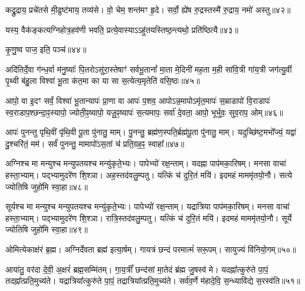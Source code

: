 कद्रु॒द्राय॒ प्रचे॑तसे मी॒ढुष्ट॑माय॒ तव्य॑से। 
वो॒ चेम॒ शन्त॑मꣳ हृ॒दे। 
सर्वो॒ ह्ये॑ष रु॒द्रस्तस्मै॑ रु॒द्राय॒ नमो॑ अस्तु॥४२॥
\anuvakamend

यस्य॒ वैक॑ङ्कत्यग्निहोत्र॒हव॑णी भवति॒ प्रत्ये॒वास्याऽऽहु॑तय\-स्तिष्ठ॒न्त्यथो॒ प्रति॑ष्ठित्यै॥४३॥
\anuvakamend


कृ॒णु॒ष्व पाज॒ इति॒ पञ्च॑॥४४॥
\anuvakamend

अदि॑तिर्दे॒वा ग॑न्ध॒र्वा म॑नु॒ष्याः᳚ पि॒तरोऽसु॑रा॒स्तेषाꣳ॑ सर्वभू॒तानां᳚ मा॒ता मे॒दिनी॑ मह॒ता म॒ही सा॑वि॒त्री गा॑य॒त्री जग॑त्यु॒र्वी पृ॒थ्वी ब॑हु॒ला विश्वा॑ भू॒ता क॑त॒मा का या सा स॒त्येत्य॒मृतेति॑ वसि॒ष्ठः॥४५॥
\anuvakamend

आपो॒ वा इ॒दꣳ सर्वं॒ विश्वा॑ भू॒तान्यापः॑ प्रा॒णा वा आपः॑ प॒शव॒ आपोऽन्न॒मापोऽमृ॑त॒मापः॑ स॒म्राडापो॑ वि॒राडापः॑ स्व॒राडाप॒श्छन्दा॒ꣴ॒स्यापो॒ ज्योती॒ꣴ॒ष्यापो॒ यजू॒ꣴ॒ष्यापः॑ स॒त्यमापः॒ सर्वा॑ दे॒वता॒ आपो॒ भूर्भुवः॒ सुव॒राप॒ ओम्॥४६॥
\anuvakamend

आपः॑ पुनन्तु पृथि॒वीं पृ॑थि॒वी पू॒ता पु॑नातु॒ माम्। 
पु॒नन्तु॒ ब्रह्म॑ण॒स्पति॒र्ब्रह्म॑पू॒ता पु॑नातु॒ माम्। 
यदुच्छि॑ष्ट॒मभो᳚ज्यं॒ यद्वा॑ दु॒श्चरि॑तं॒ मम॑। 
सर्वं॑ पुनन्तु॒ मामापो॑ऽस॒तां च॑ प्रति॒ग्रह॒ꣴ॒ स्वाहा᳚॥४७॥
\anuvakamend


अग्निश्च मा मन्युश्च मन्युपतयश्च मन्यु॑कृते॒भ्यः। 
पापेभ्यो॑ रक्ष॒न्ताम्। 
यदह्ना पाप॑मका॒रिषम्। 
मनसा वाचा॑ हस्ता॒भ्याम्। 
पद्भ्यामुदरे॑ण शि॒श्ञा। 
अह॒स्तद॑वलु॒म्पतु। 
यत्किं च॑ दुरि॒तं मयि॑। 
इदमहं माममृ॑तयो॒नौ। 
सत्ये ज्योतिषि जुहो॑मि स्वा॒हा॥४८॥
\anuvakamend


सूर्यश्च मा मन्युश्च मन्युपतयश्च मन्यु॑कृते॒भ्यः। 
पापेभ्यो॑ रक्ष॒न्ताम्। 
यद्रात्रिया पाप॑मका॒रिषम्। 
मनसा वाचा॑ हस्ता॒भ्याम्। 
पद्भ्यामुदरे॑ण शि॒श्ञा। 
रात्रि॒स्तद॑वलु॒म्पतु। 
यत्किं च॑ दुरि॒तं मयि॑। 
इदमहं माममृ॑तयो॒नौ। 
सूर्ये ज्योतिषि जुहो॑मि स्वा॒हा॥४९॥
\anuvakamend

ओमित्येकाक्ष॑रं ब्र॒ह्म। 
अग्निर्देवता ब्रह्म॑ इत्या॒र्\mbox{}षम्। 
गायत्रं छन्दं परमात्मं॑ सरू॒पम्। 
सायुज्यं वि॑नियो॒गम्॥५०॥
\anuvakamend

आया॑तु॒ वर॑दा दे॒वी॒ अ॒क्षरं॑ ब्रह्म॒सम्मि॑तम्। 
गा॒य॒त्रीं᳚ छन्द॑सां मा॒तेदं ब्र॑ह्म जु॒षस्व॑ मे। 
यदह्ना᳚त्कुरु॑ते पा॒पं॒ तदह्ना᳚त्प्रति॒मुच्य॑ते। 
यद्रात्रिया᳚त्कुरु॑ते पा॒पं॒ तद्रात्रिया᳚त्प्रति॒मुच्य॑ते। 
सर्व॑व॒र्णे म॑हादे॒वि॒ स॒न्ध्यावि॑द्ये स॒रस्व॑ति॥५१॥ 
\anuvakamend

